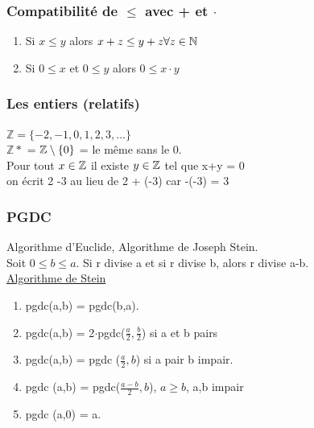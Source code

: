 \documentclass[12pt,a4paper]{article}
\begin{document}
\subsubsection{Compatibilité de $\leq$ avec + et $\cdot$}
\begin{enumerate}%
\item Si $x \leq y$ alors $x+z \leq y + z \forall z \in \mathbb{N}$
\item Si $ 0 \leq x$ et $0 \leq y$ alors $0 \leq x \cdot y$ 
\end{enumerate}

\subsubsection{Les entiers (relatifs)}
$\mathbb{Z} = \{-2, -1, 0, 1, 2, 3,...\}$\\
$\mathbb{Z*}$ = $\mathbb{Z} \setminus \{0\}$ = le même sans le 0.\\
 Pour tout $x \in \mathbb{Z}$ il existe $y \in \mathbb{Z}$ tel que x+y = 0\\
 on écrit 2 -3 au lieu de 2 + (-3) car -(-3) = 3

\subsubsection{PGDC}
Algorithme d'Euclide, Algorithme de Joseph Stein.\\
 Soit $0 \leq b \leq a$. Si r divise a et si r divise b, alors r divise a-b.\\
\underline{Algorithme de Stein}
\begin{enumerate}
\item pgdc(a,b) = pgdc(b,a).
\item pgdc(a,b) = 2$\cdot$pgdc($\frac{a}{2}, \frac{b}{2}$) si a et b pairs
\item pgdc(a,b) = pgdc ($\frac{a}{2}, b$) si a pair b impair.
\item pgdc (a,b) = pgdc($\frac{a-b}{2}, b$), $a\geq b$, a,b impair
\item pgdc (a,0) = a.
\end{enumerate}
\end{document}
